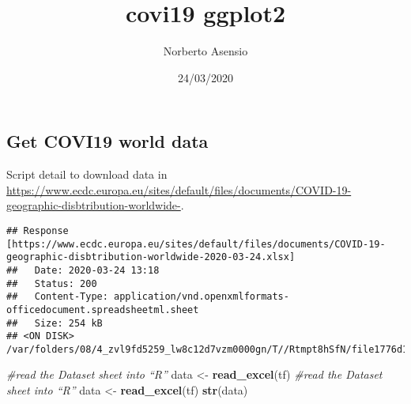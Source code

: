 \documentclass[]{article}
\title{covi19 ggplot2}
\author{Norberto Asensio}
\date{24/03/2020}
\newenvironment{Shaded}{\begin{snugshade}}{\end{snugshade}}
\newcommand{\CommentTok}[1]{\textcolor[rgb]{0.56,0.35,0.01}{\textit{#1}}}
\newcommand{\DataTypeTok}[1]{\textcolor[rgb]{0.13,0.29,0.53}{#1}}
\newcommand{\KeywordTok}[1]{\textcolor[rgb]{0.13,0.29,0.53}{\textbf{#1}}}
\newcommand{\NormalTok}[1]{#1}
\newcommand{\StringTok}[1]{\textcolor[rgb]{0.31,0.60,0.02}{#1}}
\begin{document}
\maketitle

\hypertarget{get-covi19-world-data}{%
\subsection{Get COVI19 world data}\label{get-covi19-world-data}}

Script detail to download data in
\url{https://www.ecdc.europa.eu/sites/default/files/documents/COVID-19-geographic-disbtribution-worldwide-}.

\begin{Shaded}
\end{Shaded}

\begin{verbatim}
## Response [https://www.ecdc.europa.eu/sites/default/files/documents/COVID-19-geographic-disbtribution-worldwide-2020-03-24.xlsx]
##   Date: 2020-03-24 13:18
##   Status: 200
##   Content-Type: application/vnd.openxmlformats-officedocument.spreadsheetml.sheet
##   Size: 254 kB
## <ON DISK>  /var/folders/08/4_zvl9fd5259_lw8c12d7vzm0000gn/T//Rtmpt8hSfN/file1776d1cf1a55e.xlsx
\end{verbatim}

\begin{Shaded}
\begin{Highlighting}[]
\CommentTok{#read the Dataset sheet into “R”}
\NormalTok{data <-}\StringTok{ }\KeywordTok{read_excel}\NormalTok{(tf)}
\CommentTok{#read the Dataset sheet into “R”}
\NormalTok{data <-}\StringTok{ }\KeywordTok{read_excel}\NormalTok{(tf)}
\KeywordTok{str}\NormalTok{(data)}
\end{Highlighting}
\end{Shaded}
\end{document}
